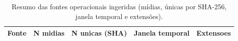 \begin{table}[!htb]
\centering
\caption{Resumo das fontes operacionais ingeridas (mídias, únicas por SHA-256, janela temporal e extensões).}
\label{tab:fontes-resumo}
\begin{tabular}{lrrrr}
\toprule
Fonte & N midias & N unicas (SHA) & Janela temporal & Extensoes \\
\midrule
\bottomrule
\end{tabular}
\end{table}
